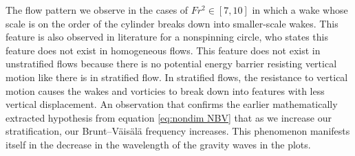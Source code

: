 The flow pattern we observe in the cases of $Fr^2 \in [7, 10]$ in which a wake whose scale is on the order of the cylinder breaks down into smaller-scale wakes. This feature is also observed in literature \cite{deng_drag_2022} for a nonspinning circle, who states this feature does not exist in homogeneous flows. This feature does not exist in unstratified flows because there is no potential energy barrier resisting vertical motion like there is in stratified flow. In stratified flows, the resistance to vertical motion causes the wakes and vorticies to break down into features with less vertical displacement. An observation that confirms the earlier mathematically extracted hypothesis from equation \ref{eq:nondim NBV} that as we increase our stratification, our Brunt–Väisälä frequency increases. This phenomenon manifests itself in the decrease in the wavelength of the gravity waves in the plots.

